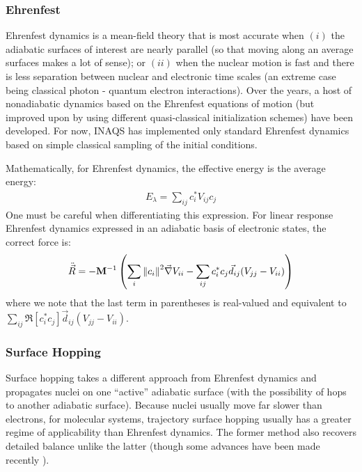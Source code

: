 \documentclass[journal=jctcce,manuscript=article,layout=traditional]{achemso}
\newcommand{\mat}[1]{\ensuremath{\mathbf{#1}}}
\begin{document}
\subsubsection{Ehrenfest}
Ehrenfest dynamics is  a mean-field theory that is most accurate when $(i)$ the adiabatic surfaces of interest are nearly parallel (so that moving along an average surfaces makes a lot of sense)\cite{bellonzi:2016:sqc}; or $(ii)$ when the nuclear motion is fast and there is less separation between nuclear and electronic time scales (an extreme case being classical photon - quantum electron interactions\cite{theta:2019:ehr1}).
Over the years, a host of nonadiabatic dynamics based on the Ehrenfest equations of motion (but improved upon by using different quasi-classical initialization schemes) have been developed.\cite{meyer_miller:1979,kapral:2008:jcp_pbme,miller:2014:sqc} For now, INAQS has implemented only standard Ehrenfest dynamics based on simple classical sampling of the initial conditions.

%
%
%
%
%

%
Mathematically, for Ehrenfest dynamics, the effective energy is the average energy:
\begin{eqnarray}
E_{\lambda} = \sum_{ij} {c_i^*  V_{ij} c_j}
\end{eqnarray}
%
One must be careful when differentiating this expression. For linear response Ehrenfest dynamics expressed in an adiabatic basis of electronic states, the correct force is:
\begin{equation}\label{eq:lrehrenfest}
    \ddot{\vec{R}} = - \mat{M}^{-1} \left( \sum_i {\norm{c_i}}^2 \vec{\nabla} V_{ii} - \sum_{ij} c_i^*  c_j \vec{d}_{ij} (V_{jj} - V_{ii})\right)
\end{equation}
where we note that the last term in parentheses is real-valued and equivalent to $\sum_{ij} \Re\left[c_i^*c_j\right]  \vec{d}_{ij} (V_{jj} - V_{ii})$.
%
%


\subsubsection{Surface Hopping}
Surface hopping takes a different approach from Ehrenfest dynamics and propagates nuclei on one ``active'' adiabatic surface (with the possibility of hops to another adiabatic surface).
Because nuclei usually move far slower than electrons, for molecular systems, trajectory surface hopping usually has a greater regime of applicability than Ehrenfest dynamics. The former method also recovers detailed balance\cite{tully:2005:detailedbalance,tully:2008:detailedbalance} unlike the latter (though some advances have been made recently \cite{miller:2015:jcp_detailedbalance}).
\end{document}
